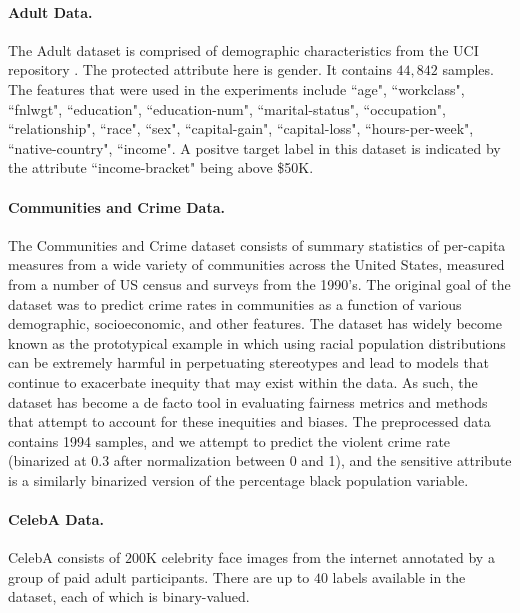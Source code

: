 \paragraph{Adult Data.}
The Adult dataset is comprised of demographic characteristics  from the UCI repository \cite{uci}. The protected attribute here is gender. It contains $44,842$ samples. The features that were used in the experiments include ``age", ``workclass", ``fnlwgt", ``education",                           ``education-num", ``marital-status", ``occupation",
                          ``relationship", ``race", ``sex", ``capital-gain",
                           ``capital-loss", ``hours-per-week", ``native-country",
                           ``income". A positve target label in this dataset is indicated by the attribute ``income-bracket" being above \$50K.
                           
\paragraph{Communities and Crime Data.}
The Communities and Crime dataset consists of summary statistics of per-capita measures from a wide variety of communities across the United States, measured from a number of US census and surveys from the 1990's. The original goal of the dataset was to predict crime rates in communities as a function of various demographic, socioeconomic, and other features. The dataset has widely become known as the prototypical example in which using racial population distributions can be extremely harmful in perpetuating stereotypes and lead to models that continue to exacerbate inequity that may exist within the data.
As such, the dataset has become a de facto tool in evaluating fairness metrics and methods that attempt to account for these inequities and biases. The preprocessed data contains 1994 samples, and we attempt to predict the violent crime rate (binarized at 0.3 after normalization between 0 and 1), and the sensitive attribute is a similarly binarized version of the percentage black population variable.

\paragraph{CelebA Data.}
CelebA \citep{liu2015faceattributes} consists of $200$K celebrity face images from the internet annotated by a group of paid adult participants. There are up to $40$ labels available in the dataset, each of which is binary-valued.